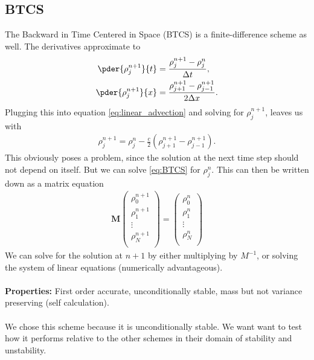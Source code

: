 \subsection{BTCS}
The Backward in Time Centered in Space  (BTCS) is a finite-difference scheme as well. The derivatives approximate to
\begin{align}
\pder{\rho^{n+1}_j}{t}&=\frac{\rho_j^{n+1}-\rho_j^{n}}{\Delta t},\\
\pder{\rho^{n+1}_j}{x}&=\frac{\rho_{j+1}^{n+1}-\rho_{j-1}^{n+1}}{2\Delta x}.
\end{align}
Plugging this into equation \cref{eq:linear_advection} and solving for $\rho^{n+1}_j$, leaves us with
\begin{align}
\rho_j^{n+1}=\rho_j^n-\frac c2\left(\rho_{j+1}^{n+1}-\rho_{j-1}^{n+1}\right).\label{eq:BTCS}
\end{align}
This obviously poses a problem, since the solution at the next time step should not depend on itself. But we can solve  \cref{eq:BTCS} for $\rho_j^n$.
This can then be written down as a matrix equation
\begin{align}
\bm M \begin{pmatrix}
\rho^{n+1}_0\\
\rho^{n+1}_1\\
\vdots\\
\rho^{n+1}_N\\
\end{pmatrix}
=
\begin{pmatrix}
\rho^{n}_0\\
\rho^{n}_1\\
\vdots\\
\rho^{n}_N\\
\end{pmatrix}
\end{align}
We can solve for the solution at $n+1$ by either multiplying by $M^{-1}$, or solving the system of linear equations (numerically advantageous). \\ \\
\textbf{Properties:} First order accurate, unconditionally stable, mass but not variance preserving (self calculation). \cite[p.61]{lec} \\ \\
We chose this scheme because it is unconditionally stable. We want want to test how it performs relative to the other schemes in their domain of stability and unstability. 
